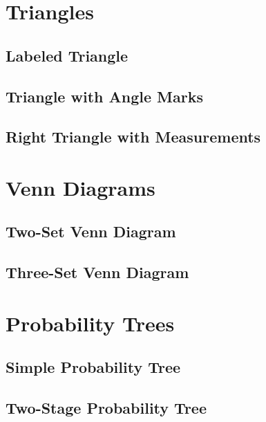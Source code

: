 \documentclass{beamer}
\begin{document}

\section{Triangles}
\subsection{Labeled Triangle}

\subsection{Triangle with Angle Marks}

\subsection{Right Triangle with Measurements}



\section{Venn Diagrams}
\subsection{Two-Set Venn Diagram}

\subsection{Three-Set Venn Diagram}



\section{Probability Trees}
\subsection{Simple Probability Tree}

\subsection{Two-Stage Probability Tree}

\end{document}
